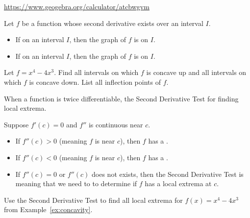 \documentclass[../main.tex]{subfiles}
\begin{document}
\begin{center}
  
  \hfill
  
  \hfill
  

  \url{https://www.geogebra.org/calculator/atcbwgvm}
\end{center}

\begin{mdframed}[style=withref-compact]
  Let \(f\) be a function whose second derivative exists over an interval \(I\).
  \begin{itemize}
    \item If \underline{\hspace{1in}} on an interval \(I\), then the graph of \(f\) is  on \(I\).
    \item If \underline{\hspace{1in}} on an interval \(I\), then the graph of \(f\) is  on \(I\).
  \end{itemize}

\end{mdframed}

\begin{example} \label{ex:concavity}
  Let \(f = x^{4} - 4x^{3}\). Find all intervals on which \(f\) is concave up and all intervals on which \(f\) is concave down. List all inflection points of \(f\).

\end{example}

\clearpage

When a function is twice differentiable, the Second Derivative Test  for finding local extrema.

\begin{mdframed}[style=withref-compact]
  Suppose \(f'(c) = 0\) and \(f''\) is continuous near \(c\).
  \begin{itemize}
    \item If \(f''(c) > 0\) (meaning \(f\) is \underline{\phantom{concave down}} near \(c\)), then \(f\) has a \underline{\hspace{1in}}.
    \item If \(f''(c) < 0\) (meaning \(f\) is \underline{\phantom{concave down}} near \(c\)), then \(f\) has a \underline{\hspace{1in}}.
    \item[\faExclamationTriangle{}] If \(f''(c) = 0\) or \(f''(c)\) does not exists, then the Second Derivative Test is  meaning that we need to  to determine if \(f\) has a local extrema at \(c\).
  \end{itemize}

\end{mdframed}

\begin{example}
  Use the Second Derivative Test to find all local extrema for \(f(x) = x^{4} - 4x^{3}\) from Example~\ref{ex:concavity}.
\end{example}
\vfill
\end{document}
